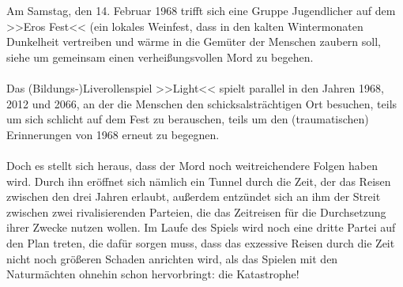 Am Samstag, den 14. Februar 1968 trifft sich eine Gruppe Jugendlicher auf dem >>Eros
Fest<< (ein lokales Weinfest, dass in den kalten Wintermonaten Dunkelheit
vertreiben und wärme in die Gemüter der Menschen zaubern soll, siehe 
 um gemeinsam einen verheißungsvollen Mord zu
begehen.\\\\
%
Das (Bildungs-)Liverollenspiel >>Light<< spielt parallel in den Jahren 1968,
2012 und 2066, an der die Menschen den schicksalsträchtigen Ort besuchen, teils
um sich schlicht auf dem Fest zu berauschen, teils um den (traumatischen)
Erinnerungen von 1968 erneut zu begegnen.\\\\
%
Doch es stellt sich heraus, dass der Mord noch weitreichendere Folgen haben
wird. Durch ihn eröffnet sich nämlich ein Tunnel durch die Zeit, der das
Reisen zwischen den drei Jahren erlaubt, außerdem entzündet sich an ihm
der Streit zwischen zwei rivalisierenden Parteien, die das Zeitreisen für die
Durchsetzung ihrer Zwecke nutzen wollen. Im Laufe des Spiels wird noch eine
dritte Partei auf den Plan treten, die dafür sorgen muss, dass das exzessive
Reisen durch die Zeit nicht noch größeren Schaden anrichten wird, als das
Spielen mit den Naturmächten ohnehin schon hervorbringt: die Katastrophe!
